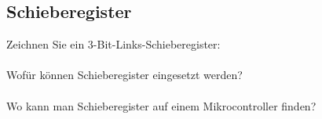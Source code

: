 \subsubsection{}


\subsection{Schieberegister}
Zeichnen Sie ein 3-Bit-Links-Schieberegister:\\
\\[0.3cm]
Wofür können Schieberegister eingesetzt werden?\\
\\[0.3cm]
Wo kann man Schieberegister auf einem Mikrocontroller finden?\\
